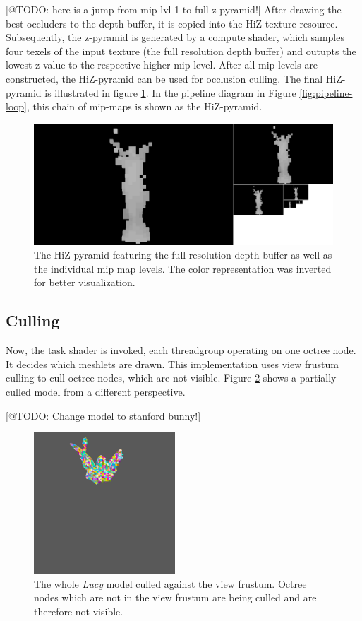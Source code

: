 [@TODO: here is a jump from mip lvl 1 to full z-pyramid!]
After drawing the best occluders to the depth buffer, it is copied into the \ac{HiZ} texture resource. Subsequently, 
the z-pyramid is generated by a compute shader, which samples four texels of the input texture (the full resolution 
depth buffer) and outupts the lowest z-value to the respective higher mip level. After all mip levels are constructed, 
the \ac{HiZ}-pyramid can be used for occlusion culling. The final \ac{HiZ}-pyramid is illustrated in figure 
\ref{fig:lucy-hiz-pyramid}. In the pipeline diagram in Figure \ref{fig:pipeline-loop}, this chain of mip-maps is shown 
as the \ac{HiZ}-pyramid.

\begin{figure}[h]
    \centering
    \includegraphics[width=\linewidth]{images/graphics/lucy-hiz-pyramid-inverted.jpg}
    \caption{The \ac{HiZ}-pyramid featuring the full resolution depth buffer as well as the individual mip map 
    levels. The color representation was inverted for better visualization.}
    \label{fig:lucy-hiz-pyramid}
\end{figure}


\subsection*{Culling} \label{subsec-task-shader}

Now, the task shader is invoked, each threadgroup operating on one octree node. It decides which 
meshlets are drawn. This implementation uses view frustum culling to cull octree nodes, which are 
not visible. Figure \ref{fig:lucy-frustum-culling} shows a partially culled model from a different 
perspective. 

[@TODO: Change model to stanford bunny!]
\begin{figure}[h]
    \centering
    \includegraphics[width=200px]{images/graphics/lucy-frustum-culling.jpg}
    \caption{The whole \emph{Lucy} model culled against the view frustum. Octree nodes which are not in the 
    view frustum are being culled and are therefore not visible.}
    \label{fig:lucy-frustum-culling}
\end{figure}

